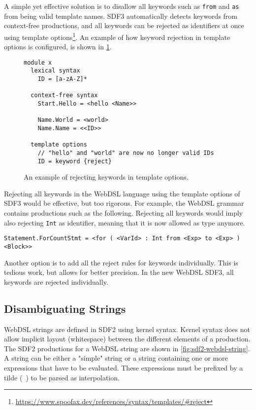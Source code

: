      A simple yet effective solution is to disallow all keywords such as \texttt{from} and \texttt{as} from being valid template names. SDF3 automatically detects keywords from context-free productions, and all keywords can be rejected as identifiers at once using template options\footnote{\url{https://www.spoofax.dev/references/syntax/templates/\#reject}}. An example of how keyword rejection in template options is configured, is shown in \cref{fig:sdf3-template-options-reject}.

      \begin{figure}
        \begin{verbatim}
module x
  lexical syntax
    ID = [a-zA-Z]*

  context-free syntax
    Start.Hello = <hello <Name>>

    Name.World = <world>
    Name.Name = <<ID>>

  template options
    // "hello" and "world" are now no longer valid IDs
    ID = keyword {reject}
        \end{verbatim}
        \caption{\label{fig:sdf3-template-options-reject}An example of rejecting keywords in template options.}
      \end{figure}

      Rejecting all keywords in the WebDSL language using the template options of SDF3 would be effective, but too rigorous. For example, the WebDSL grammar contains productions such as the following. Rejecting all keywords would imply also rejecting \texttt{Int} as identifier, meaning that it is now allowed as type anymore.
      
      \texttt{Statement.ForCountStmt = <for ( <VarId> : Int from <Exp> to <Exp> ) <Block>>}

      Another option is to add all the reject rules for keywords individually. This is tedious work, but allows for better precision. In the new WebDSL SDF3, all keywords are rejected individually.

    \subsection{Disambiguating Strings}

      WebDSL strings are defined in SDF2 using kernel syntax. Kernel syntax does not allow implicit layout (whitespace) between the different elements of a production. The SDF2 productions for a WebDSL string are shown in \cref{fig:sdf2-webdsl-string}. A string can be either a "simple" string or a string containing one or more expressions that have to be evaluated. These expressions must be prefixed by a tilde (\texttt{~}) to be parsed as interpolation.

